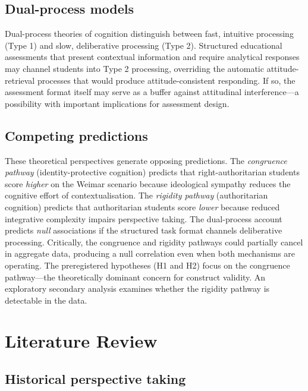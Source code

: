 \documentclass[pdflatex,sn-apa]{sn-jnl}%
\begin{document}
\subsection{Dual-process models}\label{subsec:dual}

Dual-process theories of cognition \citep{Evans2013} distinguish between fast, intuitive processing (Type 1) and slow, deliberative processing (Type 2). Structured educational assessments that present contextual information and require analytical responses may channel students into Type 2 processing, overriding the automatic attitude-retrieval processes that would produce attitude-consistent responding. If so, the assessment format itself may serve as a buffer against attitudinal interference---a possibility with important implications for assessment design.

\subsection{Competing predictions}\label{subsec:predictions}

These theoretical perspectives generate opposing predictions. The \emph{congruence pathway} (identity-protective cognition) predicts that right-authoritarian students score \emph{higher} on the Weimar scenario because ideological sympathy reduces the cognitive effort of contextualisation. The \emph{rigidity pathway} (authoritarian cognition) predicts that authoritarian students score \emph{lower} because reduced integrative complexity impairs perspective taking. The dual-process account predicts \emph{null} associations if the structured task format channels deliberative processing. Critically, the congruence and rigidity pathways could partially cancel in aggregate data, producing a null correlation even when both mechanisms are operating. The preregistered hypotheses (H1 and H2) focus on the congruence pathway---the theoretically dominant concern for construct validity. An exploratory secondary analysis examines whether the rigidity pathway is detectable in the data.


\section{Literature Review}\label{sec:litreview}

\subsection{Historical perspective taking}\label{subsec:hpt}
\end{document}
